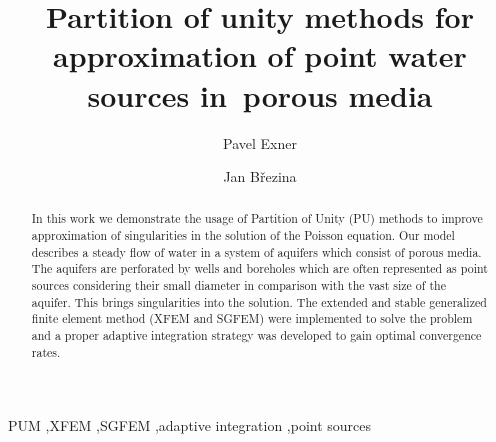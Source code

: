\documentclass[preprint,12pt]{elsarticle}
\begin{document}
\begin{frontmatter}



\title{Partition of unity methods for approximation of point water sources in~porous media}


\author[adr]{Pavel Exner}

\author[adr]{Jan B{\v r}ezina}

\address[adr]{Technical University of Liberec, Studentsk{\' a} 1402/2, 461 17 Liberec 1, Czech Republic}


\begin{abstract}
In this work we demonstrate the usage of Partition of Unity (PU) methods to improve approximation of singularities 
in the solution of the Poisson equation. Our model describes a steady flow of water in a system of aquifers
which consist of porous media. The aquifers are perforated by wells and boreholes which are often represented
as point sources considering their small diameter in comparison with the vast size of the aquifer. This 
brings singularities into the solution. The extended and stable generalized finite element method 
(XFEM and SGFEM) were implemented to solve the problem and a proper adaptive integration strategy was 
developed to gain optimal convergence rates.
\end{abstract}

\begin{keyword}
PUM \sep XFEM \sep SGFEM \sep adaptive integration \sep point sources



\end{keyword}

\end{frontmatter}
\end{document}
